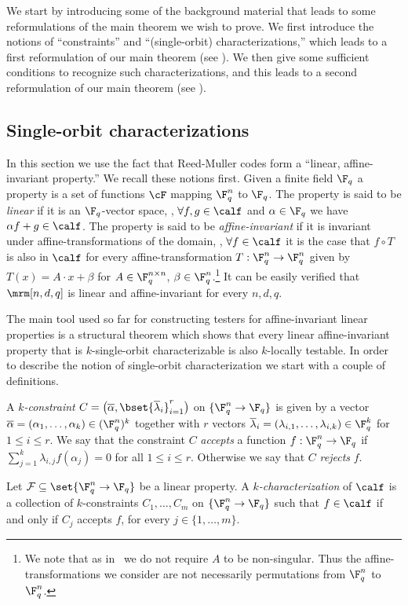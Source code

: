 We start by introducing some of the background
material that leads to some reformulations of the
main theorem we wish to prove. We first introduce
the notions of ``constraints'' and ``(single-orbit)
characterizations,'' which leads to a first reformulation
of our main theorem (see ).
We then give some sufficient
conditions to recognize such characterizations,
and this leads to a second reformulation of our
main theorem (see ).


\subsection{Single-orbit characterizations}

In this section we use the fact that Reed-Muller codes
form a ``linear, affine-invariant property.'' We recall
these notions first.
Given a finite field $\F_q$ a
property is a set of functions $\cF$ mapping $\F_{q}^n$ to $\F_q$.
The property is said to
be
\emph{linear} if
it is an $\F_q$-vector space, \ie, $\forall f,g \in \calf$
and $\alpha \in \F_q$ we have $\alpha f + g \in \calf$.
The property is said to be \emph{affine-invariant} if it is invariant under
affine-transformations of the domain, \ie,
$\forall f \in \calf$ it is the case that $f \circ T$ is also
in $\calf$ for every affine-transformation $T: \F_q^n \to \F_q^n$ given by $T(x) = A \cdot x + \beta$ for $A \in \F_q^{n \times n}$, $\beta \in \F_q^n$.\footnote{We note that as in~\cite{KS08} we do not require $A$ to be
non-singular. Thus the affine-transformations we consider are not
necessarily permutations from $\F_q^n$ to $\F_q^n$.}
It can be easily verified that $\mrm[n,d,q]$ is linear and affine-invariant
for every $n, d, q$.

The main tool used so far for constructing testers for affine-invariant linear properties is a
 structural theorem which shows that every linear affine-invariant property that is $k$-single-orbit characterizable
 is also $k$-locally testable.
 In order to describe the notion of single-orbit characterization we start with a couple of definitions.


\begin{definition}
A \emph{$k$-constraint} $C=\bigl(\overline \alpha, \bset{\overline \lambda_i}_{i=1}^{r}\bigr)$
on $\{\F_{q}^n \to \F_q\}$ is
given by a vector $\overline \alpha = (\alpha_1,\ldots,\alpha_k) \in (\F_{q}^n)^k$
together with $r$ vectors
 $\overline \lambda_i = (\lambda_{i,1}, \ldots, \lambda_{i,k}) \in \F_q^k$ for
$1 \leq i \leq r$.
We say that the constraint $C$ \emph{accepts} a function $f: \F_{q}^n \to \F_{q}$ if
$\sum_{j=1}^k \lambda_{i,j} f(\alpha_j) = 0$ for all $1 \leq i \leq r$. Otherwise we say that $C$ \emph{rejects} $f$.

Let $\mathcal{F} \subseteq \set{\F_{q}^n \to \F_q}$ be a linear property.
A \emph{$k$-characterization} of $\calf$ is a collection of $k$-constraints
$C_1, \ldots, C_m$ on $\{\F_q^n \to \F_q\}$ such that $f \in \calf$ if and only if $C_j$
accepts $f$, for every $j \in \{1,\ldots,m\}$.
\end{definition}

